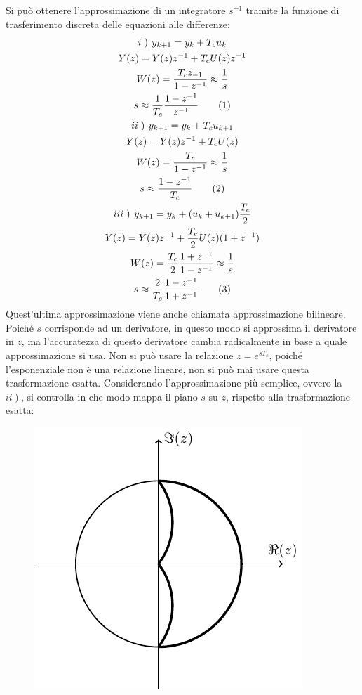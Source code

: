 \documentclass{article}
\numberwithin{equation}{subsection}
\newcommand{\tageq}{\tag{\stepcounter{equation}\theequation}}
\begin{document}
Si può ottenere l'approssimazione di un integratore $s^{-1}$ tramite la funzione di trasferimento discreta delle equazioni alle differenze:
\begin{gather*}
    i\left.\right)\:y_{k+1}=y_k+T_cu_k\\
    Y(z)=Y(z)z^{-1}+T_cU(z)z^{-1}\\
    W(z)=\displaystyle\frac{T_cz_{-1}}{1-z^{-1}}\approx\frac{1}{s}\\
    s\approx\displaystyle\frac{1}{T_c}\frac{1-z^{-1}}{z^{-1}}\tageq\\
    ii\left.\right)\:y_{k+1}=y_k+T_cu_{k+1}\\
    Y(z)=Y(z)z^{-1}+T_cU(z)\\
    W(z)=\displaystyle\frac{T_c}{1-z^{-1}}\approx\frac{1}{s}\\
    s\approx\displaystyle\frac{1-z^{-1}}{T_c}\tageq\\
    iii\left.\right)\:y_{k+1}=y_k+(u_k+u_{k+1})\displaystyle\frac{T_c}{2}\\
    Y(z)=Y(z)z^{-1}+\displaystyle\frac{T_c}{2}U(z)(1+z^{-1})\\
    W(z)=\displaystyle\frac{T_c}{2}\frac{1+z^{-1}}{1-z^{-1}}\approx\frac{1}{s}\\
    s\approx\displaystyle\frac{2}{T_c}\frac{1-z^{-1}}{1+z^{-1}}\tageq
\end{gather*}
Quest'ultima approssimazione viene anche chiamata approssimazione bilineare. Poiché $s$ corrisponde ad un derivatore, in questo modo si approssima il derivatore in $z$, ma 
l'accuratezza di questo derivatore cambia radicalmente in base a quale approssimazione si usa. 
Non si può usare la relazione $z=e^{sT_c}$, poiché l'esponenziale non è una relazione lineare, non si può mai usare questa trasformazione esatta. 
Considerando l'approssimazione più semplice, ovvero la $\left.ii\right)$, si controlla in che modo mappa il piano $s$ su $z$, rispetto alla trasformazione esatta:
\begin{figure}[H]%
    \centering
    \includegraphics{piano-z-2.pdf}%
\end{figure}
\end{document}
